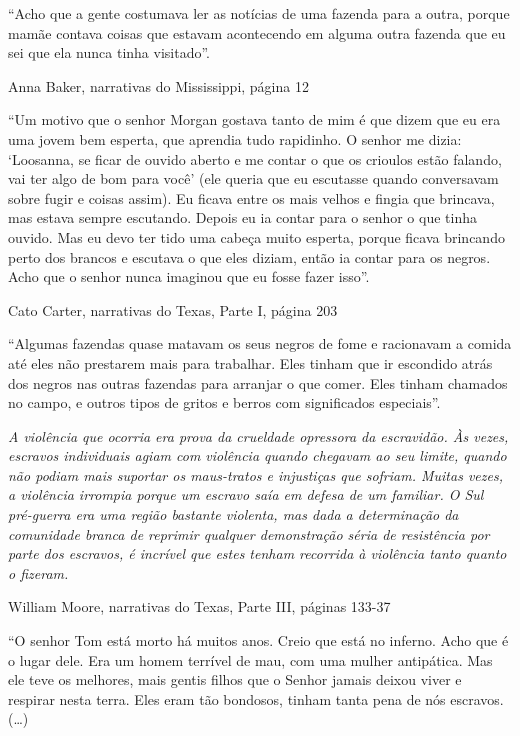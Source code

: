 ``Acho que a gente costumava ler as notícias de uma fazenda para a
outra, porque mamãe contava coisas que estavam acontecendo em alguma
outra fazenda que eu sei que ela nunca tinha visitado''.

Anna Baker, narrativas do Mississippi, página 12

``Um motivo que o senhor Morgan gostava tanto de mim é que dizem que eu
era uma jovem bem esperta, que aprendia tudo rapidinho. O senhor me
dizia: `Loosanna, se ficar de ouvido aberto e me contar o que os
crioulos estão falando, vai ter algo de bom para você' (ele queria que
eu escutasse quando conversavam sobre fugir e coisas assim). Eu ficava
entre os mais velhos e fingia que brincava, mas estava sempre escutando.
Depois eu ia contar para o senhor o que tinha ouvido. Mas eu devo ter
tido uma cabeça muito esperta, porque ficava brincando perto dos brancos
e escutava o que eles diziam, então ia contar para os negros. Acho que o
senhor nunca imaginou que eu fosse fazer isso''.

Cato Carter, narrativas do Texas, Parte I, página 203

``Algumas fazendas quase matavam os seus negros de fome e racionavam a
comida até eles não prestarem mais para trabalhar. Eles tinham que ir
escondido atrás dos negros nas outras fazendas para arranjar o que
comer. Eles tinham chamados no campo, e outros tipos de gritos e berros
com significados especiais''.

\emph{A violência que ocorria era prova da crueldade opressora da
escravidão. Às vezes, escravos individuais agiam com violência quando
chegavam ao seu limite, quando não podiam mais suportar os maus-tratos e
injustiças que sofriam. Muitas vezes, a violência irrompia porque um
escravo saía em defesa de um familiar. O Sul pré-guerra era uma região
bastante violenta, mas dada a determinação da comunidade branca de
reprimir qualquer demonstração séria de resistência por parte dos
escravos, é incrível que estes tenham recorrida à violência tanto quanto
o fizeram. }

William Moore, narrativas do Texas, Parte III, páginas 133-37

``O senhor Tom está morto há muitos anos. Creio que está no inferno.
Acho que é o lugar dele. Era um homem terrível de mau, com uma mulher
antipática. Mas ele teve os melhores, mais gentis filhos que o Senhor
jamais deixou viver e respirar nesta terra. Eles eram tão bondosos,
tinham tanta pena de nós escravos. (\ldots{})

